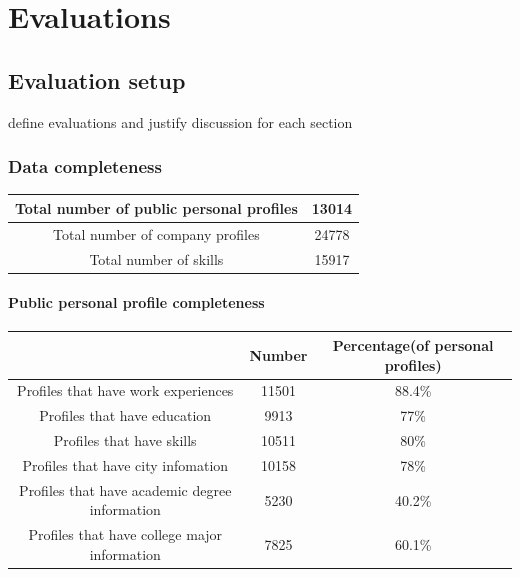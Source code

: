 \chapter{Evaluations}

\newcommand{\round}[1]{\DTLround{#1}{#1}{4}#1}

\section{Evaluation setup}

define evaluations and justify
discussion for each section

\subsection{Data completeness}

\begin{table}[H]
    \begin{tabular}{|c|c|}
    \hline
    Total number of public personal profiles & 13014 \\ \hline
    Total number of company profiles         & 24778 \\ \hline
    Total number of skills                   & 15917 \\ \hline
    \end{tabular}
\end{table}

\subsubsection{Public personal profile completeness}

\begin{table}[H]
    \begin{tabular}{|c|c|c|}
    \hline
    ~                                                             & Number & Percentage(of personal profiles) \\ \hline
    Profiles that have work experiences                           & 11501  & 88.4\%                             \\ \hline
    Profiles that have education                                  & 9913   & 77\%                               \\ \hline
    Profiles that have skills                                     & 10511  & 80\%                               \\ \hline
    Profiles that have city infomation & 10158  & 78\%                               \\ \hline
    Profiles that have academic degree information                & 5230   & 40.2\%                             \\ \hline
    Profiles that have college major information                  & 7825   & 60.1\%                             \\ \hline
    \end{tabular}
\end{table}

